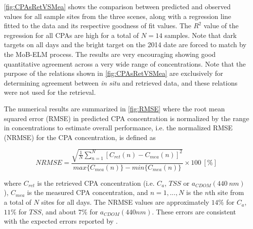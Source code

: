 \documentclass[onecolumn,3p,letterpaper]{elsarticle}
\begin{document}
\autoref{fig:CPAsRetVSMea} shows the comparison between predicted and observed values for all sample sites from the three scenes, along with a regression line fitted to the data and its respective goodness of fit values. The $R^2$ value of the regression for all CPAs are high for a total of $N=14$ samples. Note that dark targets on all days and the bright target on the 2014 date are forced to match by the MoB-ELM process. The results are very encouraging showing good quantitative agreement across a very wide range of concentrations. Note that the purpose of the relations shown in \autoref{fig:CPAsRetVSMea} are exclusively for determining agreement between {\it in situ} and retrieved data, and these relations were not used for the retrieval.

The numerical results are summarized in \autoref{fig:RMSE} where the root mean squared error (RMSE) in predicted CPA concentration is normalized by the range in concentrations to estimate overall performance, i.e. the normalized RMSE (NRMSE) for the CPA concentration, is defined as

\begin{equation}
\label{eq:error_percentage}
	NRMSE =\frac{\sqrt{\frac{1}{N}\sum_{n=1}^N{\left[C_{ret}(n) - C_{mea}(n)\right]^2}}}{max\{C_{mea}(n)\} - min\{C_{mea}(n)\}}\times100 ~[\%]
\end{equation}

\noindent where $C_{ret}$ is the retrieved CPA concentration (i.e. $C_a$, $TSS$ or $a_{CDOM}(440~nm)$), $C_{mea}$ is the measured CPA concentration, and $n=1,...,N$ is the $n$th site from a total of $N$ sites for all days. The NRMSE values are approximately $14\%$ for $C_a$, $11\%$ for $TSS$, and about $7\%$ for $a_{CDOM}(440nm)$. These errors are consistent with the expected errors reported by \citet{Gerace:2013}. 
\end{document}

